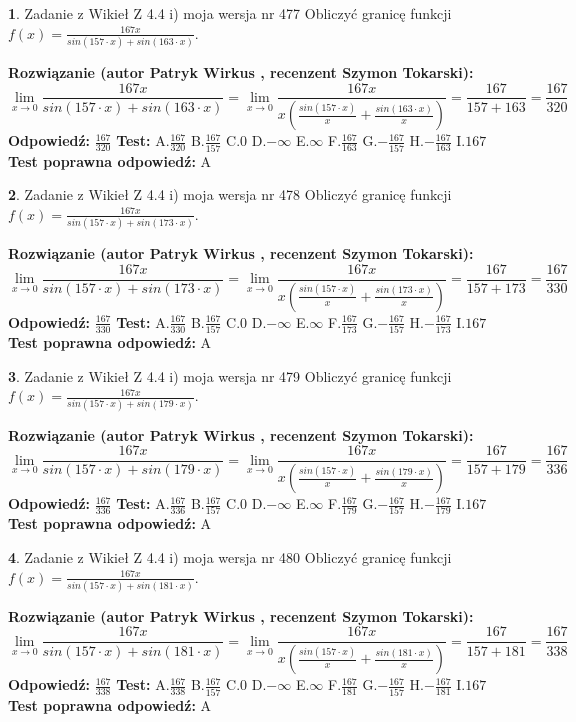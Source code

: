 \documentclass[12pt, a4paper]{article}
\theoremstyle{definition} %
\newtheorem{zad}{}
\newcommand{\zadStart}[1]{\begin{zad}#1\newline}
\newcommand{\zadStop}{\end{zad}}
\newcommand{\rozwStart}[2]{\noindent \textbf{Rozwiązanie (autor #1 , recenzent #2): }\newline}
\newcommand{\rozwStop}{\newline}
\newcommand{\odpStart}{\noindent \textbf{Odpowiedź:}\newline}
\newcommand{\odpStop}{\newline}
\newcommand{\testStart}{\noindent \textbf{Test:}\newline}
\newcommand{\testStop}{\newline}
\newcommand{\kluczStart}{\noindent \textbf{Test poprawna odpowiedź:}\newline}
\newcommand{\kluczStop}{\newline}
\begin{document}
\zadStart{Zadanie z Wikieł Z 4.4 i) moja wersja nr 477}
Obliczyć granicę funkcji $f(x)=\frac{167x}{sin(157\cdot x) +sin(163\cdot x)}$.
\zadStop
\rozwStart{Patryk Wirkus}{Szymon Tokarski}
$$\lim\limits_{x\to 0}\frac{167x}{sin(157\cdot x) +sin(163\cdot x)}=\lim\limits_{x\to 0}\frac{167x}{x(\frac{sin(157\cdot x)}{x}+\frac{sin(163\cdot x)}{x})}=\frac{167}{157+163} = \frac{167}{320}$$
\rozwStop
\odpStart
$\frac{167}{320}$
\odpStop
\testStart
A.$\frac{167}{320}$
B.$\frac{167}{157}$
C.$0$
D.$-\infty$
E.$\infty$
F.$\frac{167}{163}$
G.$-\frac{167}{157}$
H.$-\frac{167}{163}$
I.$167$
\testStop
\kluczStart
A
\kluczStop



\zadStart{Zadanie z Wikieł Z 4.4 i) moja wersja nr 478}
Obliczyć granicę funkcji $f(x)=\frac{167x}{sin(157\cdot x) +sin(173\cdot x)}$.
\zadStop
\rozwStart{Patryk Wirkus}{Szymon Tokarski}
$$\lim\limits_{x\to 0}\frac{167x}{sin(157\cdot x) +sin(173\cdot x)}=\lim\limits_{x\to 0}\frac{167x}{x(\frac{sin(157\cdot x)}{x}+\frac{sin(173\cdot x)}{x})}=\frac{167}{157+173} = \frac{167}{330}$$
\rozwStop
\odpStart
$\frac{167}{330}$
\odpStop
\testStart
A.$\frac{167}{330}$
B.$\frac{167}{157}$
C.$0$
D.$-\infty$
E.$\infty$
F.$\frac{167}{173}$
G.$-\frac{167}{157}$
H.$-\frac{167}{173}$
I.$167$
\testStop
\kluczStart
A
\kluczStop



\zadStart{Zadanie z Wikieł Z 4.4 i) moja wersja nr 479}
Obliczyć granicę funkcji $f(x)=\frac{167x}{sin(157\cdot x) +sin(179\cdot x)}$.
\zadStop
\rozwStart{Patryk Wirkus}{Szymon Tokarski}
$$\lim\limits_{x\to 0}\frac{167x}{sin(157\cdot x) +sin(179\cdot x)}=\lim\limits_{x\to 0}\frac{167x}{x(\frac{sin(157\cdot x)}{x}+\frac{sin(179\cdot x)}{x})}=\frac{167}{157+179} = \frac{167}{336}$$
\rozwStop
\odpStart
$\frac{167}{336}$
\odpStop
\testStart
A.$\frac{167}{336}$
B.$\frac{167}{157}$
C.$0$
D.$-\infty$
E.$\infty$
F.$\frac{167}{179}$
G.$-\frac{167}{157}$
H.$-\frac{167}{179}$
I.$167$
\testStop
\kluczStart
A
\kluczStop



\zadStart{Zadanie z Wikieł Z 4.4 i) moja wersja nr 480}
Obliczyć granicę funkcji $f(x)=\frac{167x}{sin(157\cdot x) +sin(181\cdot x)}$.
\zadStop
\rozwStart{Patryk Wirkus}{Szymon Tokarski}
$$\lim\limits_{x\to 0}\frac{167x}{sin(157\cdot x) +sin(181\cdot x)}=\lim\limits_{x\to 0}\frac{167x}{x(\frac{sin(157\cdot x)}{x}+\frac{sin(181\cdot x)}{x})}=\frac{167}{157+181} = \frac{167}{338}$$
\rozwStop
\odpStart
$\frac{167}{338}$
\odpStop
\testStart
A.$\frac{167}{338}$
B.$\frac{167}{157}$
C.$0$
D.$-\infty$
E.$\infty$
F.$\frac{167}{181}$
G.$-\frac{167}{157}$
H.$-\frac{167}{181}$
I.$167$
\testStop
\kluczStart
A
\kluczStop
\end{document}
